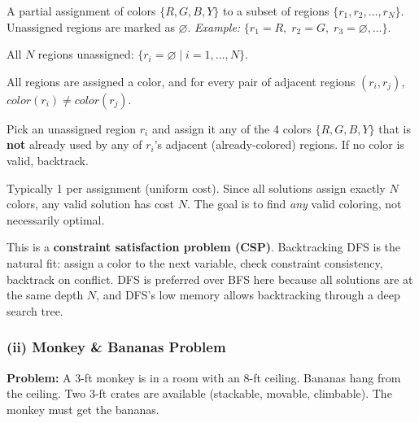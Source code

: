\documentclass[12pt, a4paper]{article}
\begin{document}
\begin{description}[leftmargin=3.6cm, labelwidth=3.4cm, labelsep=0.2cm]
  \item[\textbf{State:}]
    A partial assignment of colors $\{R,G,B,Y\}$ to a subset of regions $\{r_1, r_2, \ldots, r_N\}$. Unassigned regions are marked as $\varnothing$.
    \emph{Example:} $\{r_1{=}R,\; r_2{=}G,\; r_3{=}\varnothing, \ldots\}$.

  \item[\textbf{Initial state:}]
    All $N$ regions unassigned: $\{r_i{=}\varnothing \mid i=1,\ldots,N\}$.

  \item[\textbf{Goal test:}]
    All regions are assigned a color, and for every pair of adjacent regions $(r_i, r_j)$, $color(r_i) \neq color(r_j)$.

  \item[\textbf{Successor function:}]
    Pick an unassigned region $r_i$ and assign it any of the 4 colors $\{R,G,B,Y\}$ that is \textbf{not} already used by any of $r_i$'s adjacent (already-colored) regions. If no color is valid, backtrack.

  \item[\textbf{Path cost:}]
    Typically 1 per assignment (uniform cost). Since all solutions assign exactly $N$ colors, any valid solution has cost $N$. The goal is to find \emph{any} valid coloring, not necessarily optimal.

  \item[\textbf{Working principle:}]
    This is a \textbf{constraint satisfaction problem (CSP)}. Backtracking DFS is the natural fit: assign a color to the next variable, check constraint consistency, backtrack on conflict. DFS is preferred over BFS here because all solutions are at the same depth $N$, and DFS's low memory allows backtracking through a deep search tree.
\end{description}

\subsubsection*{(ii) Monkey \& Bananas Problem}

\textbf{Problem:} A 3-ft monkey is in a room with an 8-ft ceiling. Bananas hang from the ceiling. Two 3-ft crates are available (stackable, movable, climbable). The monkey must get the bananas.
\end{document}

